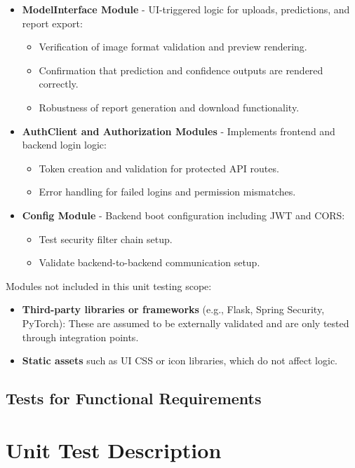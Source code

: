 \documentclass[12pt, titlepage]{article}
\begin{document}
\begin{itemize}
  \item \textbf{ModelInterface Module} - UI-triggered logic for uploads, predictions, and report export:
    \begin{itemize}
      \item Verification of image format validation and preview rendering.
      \item Confirmation that prediction and confidence outputs are rendered correctly.
      \item Robustness of report generation and download functionality.
    \end{itemize}

  \item \textbf{AuthClient and Authorization Modules} - Implements frontend and backend login logic:
    \begin{itemize}
      \item Token creation and validation for protected API routes.
      \item Error handling for failed logins and permission mismatches.
    \end{itemize}

  \item \textbf{Config Module} - Backend boot configuration including JWT and CORS:
    \begin{itemize}
      \item Test security filter chain setup.
      \item Validate backend-to-backend communication setup.
    \end{itemize}
\end{itemize}

Modules not included in this unit testing scope:
\begin{itemize}
  \item \textbf{Third-party libraries or frameworks} (e.g., Flask, Spring Security, PyTorch): These are assumed to be externally validated and are only tested through integration points.
  \item \textbf{Static assets} such as UI CSS or icon libraries, which do not affect logic.
\end{itemize}



\subsection{Tests for Functional Requirements}

\section{Unit Test Description}
\label{sec:unit-tests}
\end{document}
